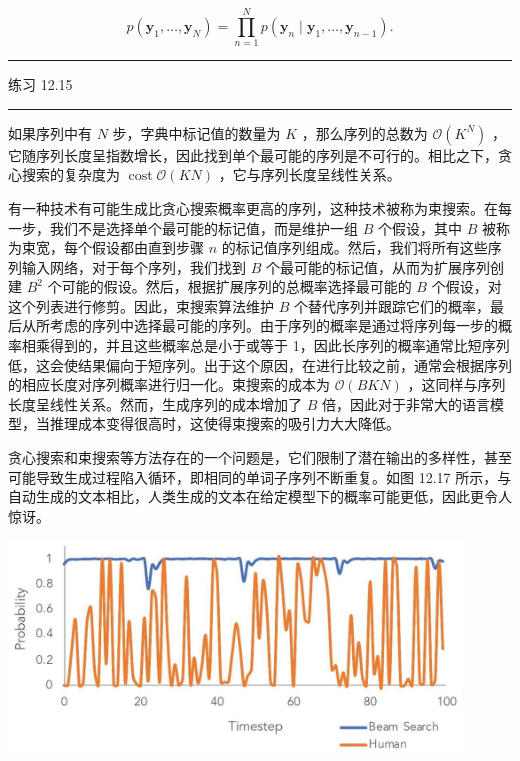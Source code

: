 \documentclass[10pt]{report}
\newcommand{\HRule}{\begin{center}\rule{0.9\linewidth}{0.2mm}\end{center}}
\begin{document}
\[
p\left( {{\mathbf{y}}_{1},\ldots ,{\mathbf{y}}_{N}}\right)  = \mathop{\prod }\limits_{{n = 1}}^{N}p\left( {{\mathbf{y}}_{n} \mid  {\mathbf{y}}_{1},\ldots ,{\mathbf{y}}_{n - 1}}\right) . \tag{12.34}
\]

\HRule

练习 12.15

\HRule

如果序列中有 \(N\) 步，字典中标记值的数量为 \(K\) ，那么序列的总数为 \(\mathcal{O}\left( {K}^{N}\right)\) ，它随序列长度呈指数增长，因此找到单个最可能的序列是不可行的。相比之下，贪心搜索的复杂度为 \(\operatorname{cost}\mathcal{O}\left( {KN}\right)\) ，它与序列长度呈线性关系。

有一种技术有可能生成比贪心搜索概率更高的序列，这种技术被称为束搜索。在每一步，我们不是选择单个最可能的标记值，而是维护一组 \(B\) 个假设，其中 \(B\) 被称为束宽，每个假设都由直到步骤 \(n\) 的标记值序列组成。然后，我们将所有这些序列输入网络，对于每个序列，我们找到 \(B\) 个最可能的标记值，从而为扩展序列创建 \({B}^{2}\) 个可能的假设。然后，根据扩展序列的总概率选择最可能的 \(B\) 个假设，对这个列表进行修剪。因此，束搜索算法维护 \(B\) 个替代序列并跟踪它们的概率，最后从所考虑的序列中选择最可能的序列。由于序列的概率是通过将序列每一步的概率相乘得到的，并且这些概率总是小于或等于 1，因此长序列的概率通常比短序列低，这会使结果偏向于短序列。出于这个原因，在进行比较之前，通常会根据序列的相应长度对序列概率进行归一化。束搜索的成本为 \(\mathcal{O}\left( {BKN}\right)\) ，这同样与序列长度呈线性关系。然而，生成序列的成本增加了 \(B\) 倍，因此对于非常大的语言模型，当推理成本变得很高时，这使得束搜索的吸引力大大降低。

贪心搜索和束搜索等方法存在的一个问题是，它们限制了潜在输出的多样性，甚至可能导致生成过程陷入循环，即相同的单词子序列不断重复。如图 12.17 所示，与自动生成的文本相比，人类生成的文本在给定模型下的概率可能更低，因此更令人惊讶。

\begin{center}
\includegraphics[max width=0.9\textwidth]{images/0194e279-9b28-703a-88f4-c3ac21e2010d_406_319_382_1145_538_0.jpg}
\end{center}
\hspace*{3em} 
\end{document}
